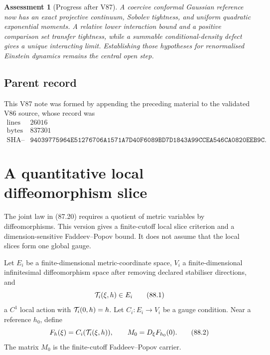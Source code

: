 \documentclass[11pt]{article}
\newtheorem{assessment}[theorem]{Assessment}
\begin{document}
\begin{assessment}[Progress after V87]
\label{ass:v11v87-status}
A coercive conformal Gaussian reference now has an exact projective
continuum, Sobolev tightness, and uniform quadratic exponential
moments.  A relative lower interaction bound and a positive comparison
set transfer tightness, while a summable conditional-density defect
gives a unique interacting limit.  Establishing those hypotheses for
renormalised Einstein dynamics remains the central open step.
\end{assessment}

\subsection{Parent record}

This V87 note was formed by appending the preceding material to the
validated V86 source, whose record was
\[
\begin{array}{c|c}
\text{lines}&26016\\
\text{bytes}&837301\\
\text{SHA--256}&
\texttt{94039775964E51276706A1571A7D40F6089BD7D1843A99CCEA546CA0820EEB9C}.
\end{array}                                                     \tag{87.21}
\]


\section{A quantitative local diffeomorphism slice}
\label{sec:v11v88}

The joint law in (87.20) requires a quotient of metric variables by
diffeomorphisms.  This version gives a finite-cutoff local slice
criterion and a dimension-sensitive Faddeev--Popov bound.  It does not
assume that the local slices form one global gauge.

Let \(E_i\) be a finite-dimensional metric-coordinate space,
\(V_i\) a finite-dimensional infinitesimal diffeomorphism space after
removing declared stabiliser directions, and
\[
                         {\cal T}_i(\xi,h)\in E_i             \tag{88.1}
\]
a \(C^1\) local action with \({\cal T}_i(0,h)=h\).  Let
\(C_i:E_i\to V_i\) be a gauge condition.  Near a reference
\(h_0\), define
\[
 F_h(\xi)=C_i({\cal T}_i(\xi,h)),\qquad
 M_0=D_\xi F_{h_0}(0).                                      \tag{88.2}
\]
The matrix \(M_0\) is the finite-cutoff Faddeev--Popov carrier.
\end{document}
